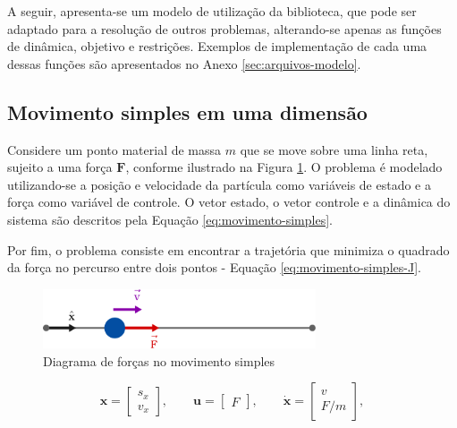 A seguir, apresenta-se um modelo de utilização da biblioteca, que pode ser adaptado para a resolução de outros problemas, alterando-se apenas as funções de dinâmica, objetivo e restrições. Exemplos de implementação de cada uma dessas funções são apresentados no Anexo \ref{sec:arquivos-modelo}.



\subsection{Movimento simples em uma dimensão}
\label{subsec:movimento-simples}

Considere um ponto material de massa $m$ que se move sobre uma linha reta, sujeito a uma força $\mathbf{F}$, conforme ilustrado na Figura \ref{fig:movimento-simples}. O problema é modelado utilizando-se a posição e velocidade da partícula como variáveis de estado e a força como variável de controle. O vetor estado, o vetor controle e a dinâmica do sistema são descritos pela Equação \ref{eq:movimento-simples}.

Por fim, o problema consiste em encontrar a trajetória que minimiza o quadrado da força no percurso entre dois pontos - Equação \ref{eq:movimento-simples-J}.

\begin{figure}[H]
    \centering
    \includegraphics[width=0.72\textwidth]{Cap3/figuras/movimento-simples.pdf}
    \caption{Diagrama de forças no movimento simples}
    \label{fig:movimento-simples}
\end{figure}

\begin{equation}
    \mathbf{x} = \begin{bmatrix}
        s_x \\
        v_x
    \end{bmatrix},
    \qquad
    \mathbf{u} = \begin{bmatrix}
        F
    \end{bmatrix},
    \qquad
    \dot{\mathbf{x}} = \begin{bmatrix}
        v \\
        F/m
    \end{bmatrix},
    \label{eq:movimento-simples}
\end{equation}

